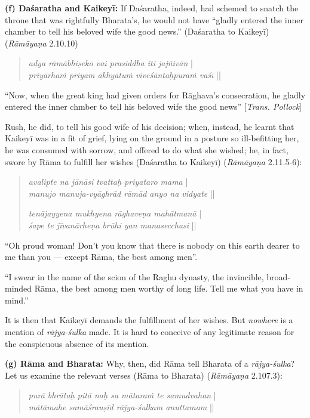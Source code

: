 \smallskip
\noindent
\textbf{(f) Daśaratha and Kaikeyī:} If Daśaratha, indeed, had schemed to snatch the throne that was rightfully Bharata’s, he would not have “gladly entered the inner chamber to tell his beloved wife the good news.” (Daśaratha to Kaikeyī) ({\sl Rāmāyaṇa} 2.10.10)
\begin{quote}
{{\sl adya rāmābhiṣeko vai prasiddha iti jajñivān}} |\\
{\sl priyārhaṁ priyam ākhyātuṁ viveśāntaḥpuraṁ vaśī} || 
\end{quote}

\begin{myquote}
“Now, when the great king had given orders for Rāghava’s consecration, he gladly entered the inner chmber to tell his beloved wife the good news” [{\sl Trans. Pollock}]
\end{myquote}

Rush, he did, to tell his good wife of his decision; when, instead, he learnt that Kaikeyī was in a fit of grief, lying on the ground in a posture so ill-befitting her, he was consumed with sorrow, and offered to do what she wished; he, in fact, swore by Rāma to fulfill her wishes (Daśaratha to Kaikeyī) ({\sl Rāmāyaṇa} 2.11.5-6): 
\begin{quote}
{{\sl avalipte na jānāsi tvattaḥ priyataro mama}} |\\
{\sl manujo manuja-vyāghrād rāmād anyo na vidyate} || 

{\sl tenājayyena mukhyena rāghaveṇa mahātmanā} |\\
{\sl śape te jīvanārheṇa brūhi yan manasecchasi} ||
\end{quote}

\begin{myquote}
“Oh proud woman! Don't you know that there is nobody on this earth dearer to me than you --- except Rāma, the best among men”.

“I swear in the name of the scion of the Raghu dynasty, the invincible, broad-minded Rāma, the best among men worthy of long life. Tell me what you have in mind.”
\end{myquote}

It is then that Kaikeyī demands the fulfillment of her wishes. But {\sl nowhere} is a mention of {\sl rājya-śulka} made. It is hard to conceive of any legitimate reason for the conspicuous absence of its mention.

\smallskip
\noindent
\textbf{(g) Rāma and Bharata:}  Why, then, did Rāma tell Bharata of a {\sl rājya-śulka}? Let us examine the relevant verses (Rāma to Bharata) ({\sl Rāmāyaṇa} 2.107.3): 
\begin{quote}
{{\sl purā bhrātaḥ pitā naḥ sa mātaraṁ te samudvahan}} |\\
{\sl mātāmahe samāśrauṣīd rājya-śulkam anuttamam} || 
\end{quote}

